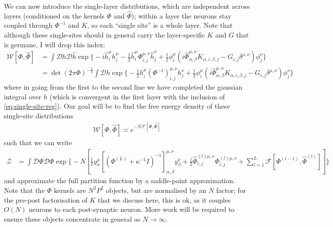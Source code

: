 \documentclass[../main.tex]{subfiles}
\begin{document}
We can now introduce the single-layer distributions, which are independent across layers (conditioned on the kernels $\Phi$ and $\hat \Phi$); within a layer the neurons stay coupled through $\Phi^{-1}$ and $K$, so each ``single site'' is a whole layer. Note that although these single-sites should in general carry the layer-specific $K$ and $G$ that is germane, I will drop this index:
\begin{align}
  \mathcal W[\Phi, \hat \Phi] &= 
  \int \mathcal{D} h \mathcal{D} \hat h
    \exp \Bigg \{
      - i \hat h^{\mu}_{i} h^{\mu}_i 
      - \frac12 \hat h^{\mu}_i \Phi^{\mu,\nu}_{i,j} \hat h^{\nu}_j
      + \frac12 \phi^{\mu}_i \left( i \hat \Phi^{\mu,\nu}_{\alpha,\beta} K_{\alpha,i,\beta,j} - G_{i,j} \delta^{\mu,\nu}  \right) \phi^{\nu}_j
    \Bigg \} \\
  &= 
  \det(2 \pi \Phi)^{-\frac12}
  \int \mathcal{D} h \exp \Bigg \{
    - \frac12 h^{\mu}_i (\Phi^{-1})^{\mu,\nu}_{i,j} h^{\nu}_j 
    + \frac12 \phi^{\mu}_i \left( i \hat \Phi^{\mu,\nu}_{\alpha,\beta} K_{\alpha,i,\beta,j} - G_{i,j} \delta^{\mu,\nu}  \right) \phi^{\nu}_j
  \Bigg \} \label{eq:single-site}
\end{align}
where in going from the first to the second line we have completed the gaussian integral over $\hat h$ (which is convergent in the first layer with the inclusion of \eqref{eq:single-site-reg}). Our goal will be to find the free energy density of these single-site distributions
\begin{align*}
  \mathcal W[\Phi, \hat \Phi] \asymp e^{-N \mathcal F[\Phi, \hat \Phi]}
\end{align*}
such that we can write
\begin{align*}
  \mathcal Z &=
    \int \mathcal{D} \Phi \mathcal{D} \hat \Phi
    \exp \Bigg \{
      -N \left[
      \frac12 y^{\mu}_{\alpha} \left[ (\Phi^{(L)} + \kappa^{-1} I )^{-1} \right]^{\mu,\nu}_{\alpha,\beta} y^{\nu}_{\beta}
      + \frac{i}{2} \hat \Phi^{(l)\mu,\nu}_{i,j} \Phi^{(l)\mu,\nu}_{i,j}
      + \sum_{l=1}^L \mathcal F[\Phi^{(l-1)}, \hat \Phi^{(l)}]
     \right]
    \Bigg \}
\end{align*}
and approximate the full partition function by a saddle-point approximation. Note that the $\Phi$ kernels are $N^2 P^2$ objects, but are normalised by an $N$ factor; for the pre-post factorisation of $K$ that we discuss here, this is ok, as it couples $O(N)$ neurons to each post-synaptic neuron. More work will be required to ensure these objects concentrate in general as $N \rightarrow \infty$.
\end{document}
